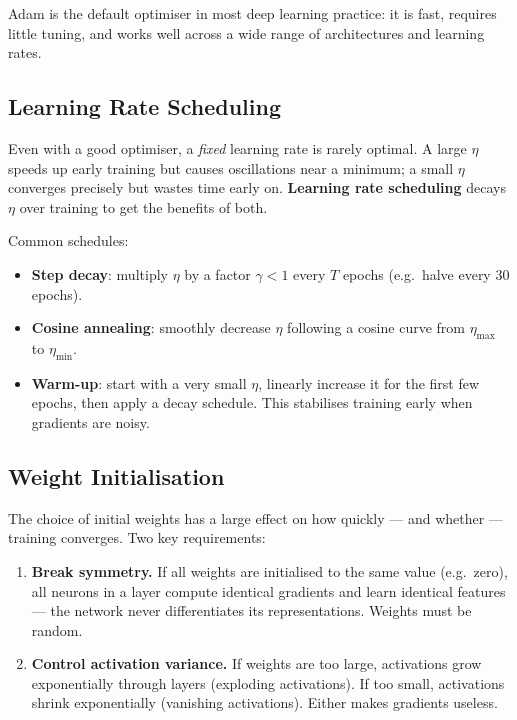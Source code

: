 \documentclass[11pt,a4paper]{article}
\newcommand{\term}[1]{\textcolor{DefGreen}{\textbf{#1}}\index{#1}}
\begin{document}
Adam is the default optimiser in most deep learning practice: it is fast, requires little tuning, and works well across a wide range of architectures and learning rates.

\subsection{Learning Rate Scheduling}

Even with a good optimiser, a \emph{fixed} learning rate is rarely optimal. A large $\eta$ speeds up early training but causes oscillations near a minimum; a small $\eta$ converges precisely but wastes time early on. \term{Learning rate scheduling} decays $\eta$ over training to get the benefits of both.

Common schedules:
\begin{itemize}
  \item \textbf{Step decay}: multiply $\eta$ by a factor $\gamma < 1$ every $T$ epochs (e.g.\ halve every 30 epochs).
  \item \textbf{Cosine annealing}: smoothly decrease $\eta$ following a cosine curve from $\eta_{\max}$ to $\eta_{\min}$.
  \item \textbf{Warm-up}: start with a very small $\eta$, linearly increase it for the first few epochs, then apply a decay schedule. This stabilises training early when gradients are noisy.
\end{itemize}

\subsection{Weight Initialisation}

The choice of initial weights has a large effect on how quickly — and whether — training converges. Two key requirements:

\begin{enumerate}
  \item \textbf{Break symmetry.} If all weights are initialised to the same value (e.g.\ zero), all neurons in a layer compute identical gradients and learn identical features — the network never differentiates its representations. Weights must be random.
  \item \textbf{Control activation variance.} If weights are too large, activations grow exponentially through layers (exploding activations). If too small, activations shrink exponentially (vanishing activations). Either makes gradients useless.
\end{enumerate}
\end{document}
